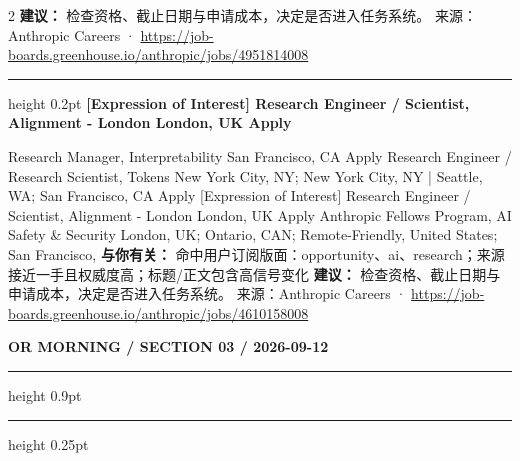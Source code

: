 \documentclass[10.5pt]{ctexart}
\begin{document}
\begin{multicols}{2}
\textbf{建议：} 检查资格、截止日期与申请成本，决定是否进入任务系统。
{\footnotesize\color{ormuted} 来源：Anthropic Careers · \url{https://job-boards.greenhouse.io/anthropic/jobs/4951814008}}
\vspace{2mm}
\hrule height 0.2pt
\vspace{2mm}
{\large\bfseries [Expression of Interest] Research Engineer / Scientist, Alignment - London London, UK Apply}\par
[Expression of Interest] Research Manager, Interpretability San Francisco, CA Apply Research Engineer / Research Scientist, Tokens New York City, NY; New York City, NY | Seattle, WA; San Francisco, CA Apply [Expression of Interest] Research Engineer / Scientist, Alignment - London London, UK Apply Anthropic Fellows Program, AI Safety \& Security London, UK; Ontario, CAN; Remote-Friendly, United States; San Francisco, 
\textbf{与你有关：} 命中用户订阅版面：opportunity、ai、research；来源接近一手且权威度高；标题/正文包含高信号变化
\textbf{建议：} 检查资格、截止日期与申请成本，决定是否进入任务系统。
{\footnotesize\color{ormuted} 来源：Anthropic Careers · \url{https://job-boards.greenhouse.io/anthropic/jobs/4610158008}}
\end{multicols}
\newpage
{\small\bfseries OR MORNING / SECTION 03 / 2026-09-12}
\vspace{2mm}
\hrule height 0.9pt
\vspace{1.5mm}
\hrule height 0.25pt
\vspace{4mm}
\end{document}
